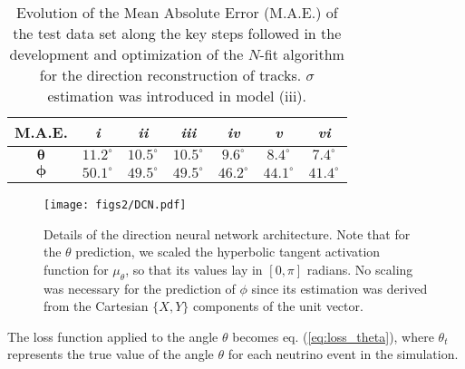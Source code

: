 
\begin{table}[htbp]
	\centering
	\renewcommand{\arraystretch}{1.2} %
	\begin{tabular}{|c|cc:cccc|}
		\hline
		\textbf{M.A.E.} & \textbf{\textit{i}} & \textbf{\textit{ii}} & \textbf{\textit{iii }} & \textbf{\textit{iv}} & \textbf{\textit{v}} & \textbf{\textit{vi}} \\ \hline
		$\boldsymbol{\theta}$ & $11.2^\circ$ & $10.5^\circ$ & $10.5^\circ$ & $9.6^\circ$ & $8.4^\circ$ & $7.4^\circ$  \\ %
		$\boldsymbol{\phi}$ & $50.1^\circ$ & $49.5^\circ$ & $49.5^\circ$ & $46.2^\circ$ & $44.1^\circ$ & $41.4^\circ$ \\ \hline
	\end{tabular}
	\caption{\label{tab:comparison}Evolution of the Mean Absolute Error (M.A.E.) of the test data set along the key steps followed in the development and optimization of the $N$-fit algorithm for the direction reconstruction of tracks. $\sigma$ estimation was introduced in model (iii).}
\end{table}

\begin{figure}[htbp]
	\centering
	\texttt{[image: figs2/DCN.pdf]}
	\caption{\label{fig:network}Details of the direction neural network architecture. Note that for the $\theta$ prediction, we scaled the hyperbolic tangent activation function for $\mu_\theta$, so that its values lay in $[0, \pi]$ radians. No scaling was necessary for the prediction of $\phi$ since its estimation was derived from the Cartesian $\{X,Y\}$ components of the unit vector.}
\end{figure}

The loss function applied to the angle $\theta$ becomes eq. (\ref{eq:loss_theta}), where $\theta_t$ represents the true value of the angle $\theta$ for each neutrino event in the simulation.

